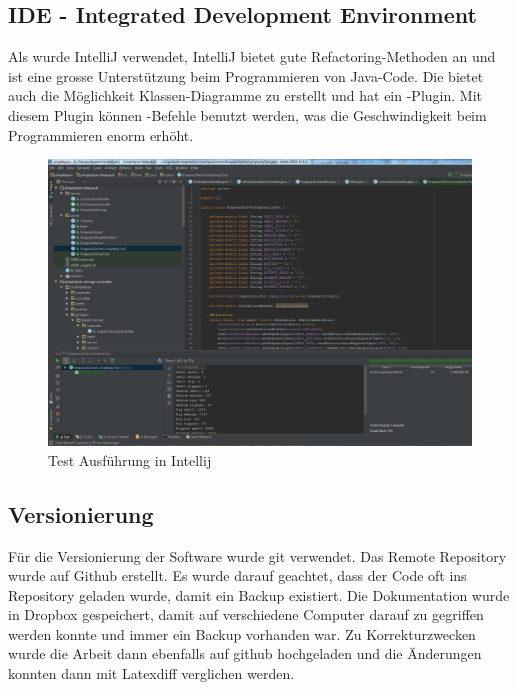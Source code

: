 \subsection{IDE - Integrated Development Environment}
Als  wurde IntelliJ verwendet, IntelliJ bietet gute Refactoring-Methoden an und ist eine grosse Unterstützung beim Programmieren von Java-Code. Die  
bietet auch die Möglichkeit Klassen-Diagramme zu erstellt und hat ein -Plugin. Mit diesem Plugin können -Befehle benutzt werden, was die 
Geschwindigkeit beim Programmieren enorm erhöht.

\begin{figure}[h]
\centering
\includegraphics[scale=0.4]{images/intellij.png}
\caption[Test Ausführung in Intellij]{Test Ausführung in Intellij \selfmade{}}
\label{fig:intellij}
\end{figure}

\subsection{Versionierung}
Für die Versionierung der Software wurde git \cite{git} verwendet. Das Remote Repository wurde auf Github \cite{github_simplatyzer} erstellt. Es wurde darauf geachtet, dass 
der Code oft ins Repository geladen wurde, damit ein Backup existiert. Die Dokumentation wurde in Dropbox gespeichert, damit auf verschiedene Computer darauf zu gegriffen werden konnte 
und immer ein Backup vorhanden war. Zu Korrekturzwecken wurde die Arbeit dann ebenfalls auf github hochgeladen und die Änderungen konnten dann mit Latexdiff verglichen werden.

